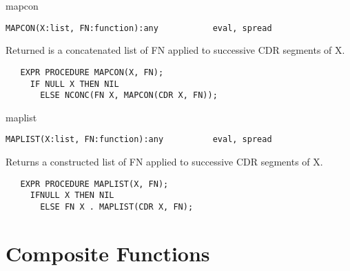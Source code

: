 \begin{Function}{mapcon}
\begin{verbatim}
MAPCON(X:list, FN:function):any           eval, spread
\end{verbatim}
   Returned  is a concatenated  list of FN  applied to successive
   CDR segments of X.
\begin{verbatim}
   EXPR PROCEDURE MAPCON(X, FN);
     IF NULL X THEN NIL
       ELSE NCONC(FN X, MAPCON(CDR X, FN));
\end{verbatim}

\end{Function}
\begin{Function}{maplist}
\begin{verbatim}
MAPLIST(X:list, FN:function):any          eval, spread
\end{verbatim}
   Returns  a constructed  list of  FN applied  to successive CDR
   segments of X.
\begin{verbatim}
   EXPR PROCEDURE MAPLIST(X, FN);
     IFNULL X THEN NIL
       ELSE FN X . MAPLIST(CDR X, FN);
\end{verbatim}
\end{Function}

\section{Composite Functions}


